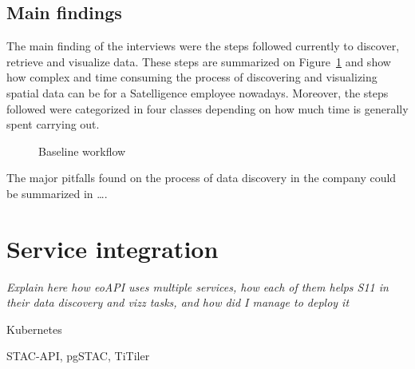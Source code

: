 \documentclass[
  oneside,
  open=any]{scrbook}
\begin{document}
\subsection{Main findings}\label{main-findings}

The main finding of the interviews were the steps followed currently to
discover, retrieve and visualize data. These steps are summarized on
Figure~\ref{fig-baseline} and show how complex and time consuming the
process of discovering and visualizing spatial data can be for a
Satelligence employee nowadays. Moreover, the steps followed were
categorized in four classes depending on how much time is generally
spent carrying out.

\begin{figure}[H]


\caption{\label{fig-baseline}Baseline workflow}

\end{figure}%

The major pitfalls found on the process of data discovery in the company
could be summarized in \ldots.

\section{Service integration}\label{service-integration}

\emph{Explain here how eoAPI uses multiple services, how each of them
helps S11 in their data discovery and vizz tasks, and how did I manage
to deploy it}

Kubernetes

STAC-API, pgSTAC, TiTiler
\end{document}
